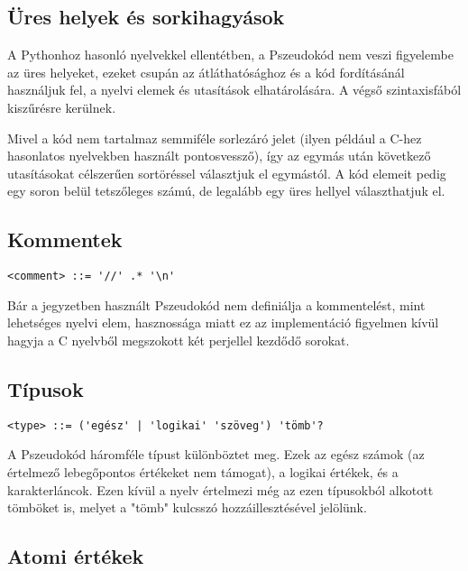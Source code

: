 \subsection{Üres helyek és sorkihagyások}

A Pythonhoz hasonló nyelvekkel ellentétben, a Pszeudokód nem veszi figyelembe az üres helyeket, ezeket csupán az átláthatósághoz és a kód fordításánál használjuk fel, a nyelvi elemek és utasítások elhatárolására. A végső szintaxisfából kiszűrésre kerülnek.

Mivel a kód nem tartalmaz semmiféle sorlezáró jelet (ilyen például a C-hez hasonlatos nyelvekben használt pontosvessző), így az egymás után következő utasításokat célszerűen sortöréssel választjuk el egymástól. A kód elemeit pedig egy soron belül tetszőleges számú, de legalább egy üres hellyel választhatjuk el.

\subsection{Kommentek}

\begin{footnotesize}
\begin{verbatim}
<comment> ::= '//' .* '\n'
\end{verbatim}
\end{footnotesize}

Bár a jegyzetben használt Pszeudokód nem definiálja a kommentelést, mint lehetséges nyelvi elem, hasznossága miatt ez az implementáció figyelmen kívül hagyja a C nyelvből megszokott két perjellel kezdődő sorokat.

\subsection{Típusok}

\begin{footnotesize}
\begin{verbatim}
<type> ::= ('egész' | 'logikai' 'szöveg') 'tömb'?
\end{verbatim}
\end{footnotesize}

A Pszeudokód háromféle típust különböztet meg. Ezek az egész számok (az értelmező lebegőpontos értékeket nem támogat), a logikai értékek, és a karakterláncok. Ezen kívül a nyelv értelmezi még az ezen típusokból alkotott tömböket is, melyet a "tömb" kulcsszó hozzáillesztésével jelölünk.

\subsection{Atomi értékek}

